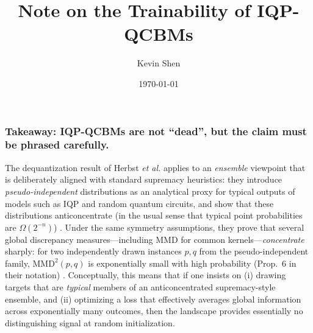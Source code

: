 \documentclass[a4paper,onecolumn,notitlepage,nofootinbib,longbibliography,superscriptaddress, floatfix, pra, aps, 10pt]{revtex4-2}
\newcommand{\aqa}{$\langle aQa^L \rangle$ Applied Quantum Algorithms, Leiden University, The Netherlands}
\newcommand{\liacs}{LIACS, Leiden University, Niels Bohrweg 1, 2333 CA, Leiden, The Netherlands}
\newcommand{\bmw}{BMW Group, 80788 München, Germany}
\begin{document}
\title{Note on the Trainability of IQP-QCBMs}
\date{\today}

\author{Kevin Shen}




 
\begin{abstract}

\end{abstract}


\maketitle

\subsubsection{Takeaway: IQP-QCBMs are not ``dead'', but the claim must be phrased carefully.}
The dequantization result of Herbst \emph{et al.} applies to an \emph{ensemble} viewpoint that is deliberately aligned with standard supremacy heuristics: they introduce \emph{pseudo-independent} distributions as an analytical proxy for typical outputs of models such as IQP and random quantum circuits, and show that these distributions anticoncentrate (in the usual sense that typical point probabilities are $\Omega(2^{-n})$) \cite[Def.~2, Prop.~2]{herbst25}. Under the same symmetry assumptions, they prove that several global discrepancy measures---including MMD for common kernels---\emph{concentrate} sharply: for two independently drawn instances $p,q$ from the pseudo-independent family, $\mathrm{MMD}^2(p,q)$ is exponentially small with high probability (Prop.~6 in their notation) \cite[Prop.~6]{herbst25}. Conceptually, this means that if one insists on (i) drawing targets that are \emph{typical} members of an anticoncentrated supremacy-style ensemble, and (ii) optimizing a loss that effectively averages global information across exponentially many outcomes, then the landscape provides essentially no distinguishing signal at random initialization.
\end{document}
